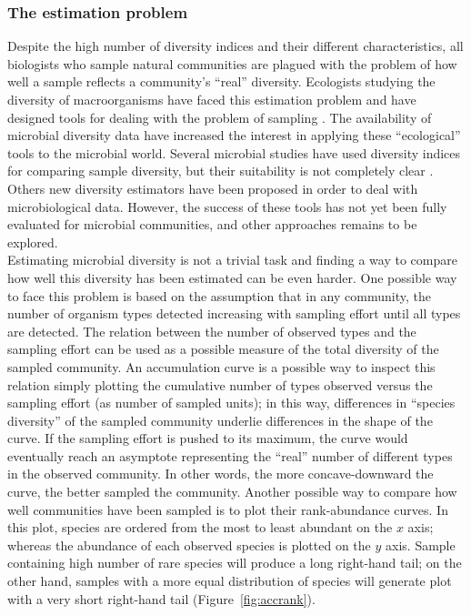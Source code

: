 \subsubsection{The estimation problem}
Despite the high number of diversity indices and their different characteristics, all biologists who sample natural communities are plagued with the problem of how well a sample reflects a community's ``real'' diversity. Ecologists studying the diversity of macroorganisms have faced this estimation problem and have designed tools for dealing with the problem of sampling \cite{heck1975explicit, magurran1988ecological, colwell1994estimating}. The availability of microbial diversity data have increased the interest in applying these ``ecological'' tools to the microbial world. Several microbial studies have used diversity indices for comparing sample diversity, but their suitability is not completely clear \cite{mcmurdie2014waste}. Others new diversity estimators have been proposed in order to deal with microbiological data. However, the success of these tools has not yet been fully evaluated for microbial communities, and other approaches remains to be explored.\\
Estimating microbial diversity is not a trivial task and finding a way to compare how well this diversity has been estimated can be even harder. One possible way to face this problem is based on the assumption that in any community, the number of organism types detected increasing with sampling effort until all types are detected. The relation between the number of observed types and the sampling effort can be used as a possible measure of the total diversity of the sampled community. An accumulation curve is a possible way to inspect this relation simply plotting the cumulative number of types observed versus the sampling effort (as number of sampled units); in this way, differences in ``species diversity'' of the sampled community underlie differences in the shape of the curve. If the sampling effort is pushed to its maximum, the curve would eventually reach an asymptote representing the ``real'' number of different types in the observed community. In other words, the more concave-downward the curve, the better sampled the community. Another possible way to compare how well communities have been sampled is to plot their rank-abundance curves. In this plot, species are ordered from the most to least abundant on the $x$ axis; whereas the abundance of each observed species is plotted on the $y$ axis. Sample containing high number of rare species will produce a long right-hand tail; on the other hand, samples with a more equal distribution of species will generate plot with a very short right-hand tail (Figure~\ref{fig:accrank}).\\%
